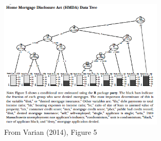 \documentclass[12pt]{article}
\theoremstyle{definition}
\theoremstyle{property}
\theoremstyle{assumption}
\theoremstyle{example}
\theoremstyle{comment}
\begin{document}
\begin{figure}[H]
\centering
\includegraphics[width=0.7\textwidth, keepaspectratio]{randomforest.png}
\caption{From Varian (2014), Figure 5}
\end{figure}\par
\end{document}
